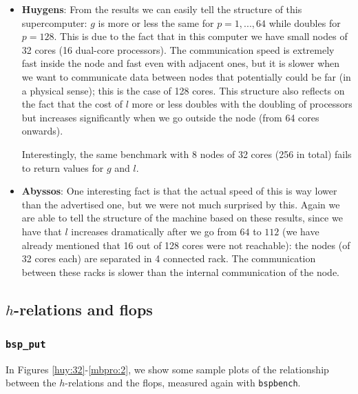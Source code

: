 \documentclass[a4paper,11pt]{article}
\begin{document}
\begin{itemize}
\item \textbf{Huygens}: From the results we can easily tell the structure of this supercomputer: $g$ is more or less the same for $p=1,...,64$ while doubles for $p=128$. This is due to the fact that in this computer we have small nodes of 32 cores (16 dual-core processors). The communication speed is extremely fast inside the node and fast even with adjacent ones, but it is slower when we want to communicate data between nodes that potentially could be far (in a physical sense); this is the case of 128 cores. This structure also reflects on the fact that the cost of $l$ more or less doubles with the doubling of processors but increases significantly when we go outside the node (from 64 cores onwards).

    Interestingly, the same benchmark with 8 nodes of 32 cores (256 in total) fails to return values for $g$ and $l$.

\item \textbf{Abyssos}: One interesting fact is that the actual speed of this is way lower than the advertised one, but we were not much surprised by this. Again we are able to tell the structure of the machine based on these results, since we have that $l$ increases dramatically after we go from $64$ to $112$ (we have already mentioned that 16 out of 128 cores were not reachable): the nodes (of 32 cores each) are separated in 4 connected rack. The communication between these racks is slower than the internal communication of the node.
\end{itemize}

\subsection{$h$-relations and flops}

\subsubsection{\texttt{bsp\_put}}

In Figures \ref{huy:32}-\ref{mbpro:2}, we show some sample plots of the relationship between the $h$-relations and the flops, measured again with \verb|bspbench|.
\end{document}

